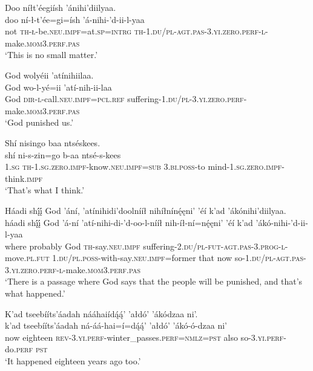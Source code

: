 \newpage
\ea\label{ex:text9-15-2}
Doo níłt’éegiísh ’ánihi’diilyaa.\\
\gll doo	ní-ł-t’ée=gi=ísh	’á-nihi-’d-ii-l-yaa\\
     not	\textsc{th}-\textsc{ł}-be.\textsc{neu}.\textsc{impf}=at.\textsc{sp}=\textsc{intrg}	\textsc{th}-1.\textsc{du}/\textsc{pl}-\textsc{agt}.\textsc{pas}-3.\textsc{yi}.\textsc{zero}.\textsc{perf}-\textsc{l}-make.\textsc{mom}3.\textsc{perf}.\textsc{pas}\\
\glt `This is no small matter.'
\z

\ea\label{ex:text9-15-3}
God wolyéii ’atínihiilaa.\\
\gll God	wo-l-yé=ii	’atí-nih-ii-laa\\
     God	\textsc{dir}-\textsc{l}-call.\textsc{neu}.\textsc{impf}=\textsc{pcl}.\textsc{ref}	suffering-1.\textsc{du}/\textsc{pl}-3.\textsc{yi}.\textsc{zero}.\textsc{perf}-make.\textsc{mom}3.\textsc{perf}.\textsc{pas}\\
\glt `God punished us.'
\z

\ea\label{ex:text9-15-4}
Shí nisingo baa ntséskees.\\
\gll shí	ni-s-zin=go	b-aa	ntsé-s-kees\\
     1.\textsc{sg}	\textsc{th}-1.\textsc{sg}.\textsc{zero}.\textsc{impf}-know.\textsc{neu}.\textsc{impf}=\textsc{sub}	3.\textsc{bi}.\textsc{poss}-to	mind-1.\textsc{sg}.\textsc{zero}.\textsc{impf}-think.\textsc{impf}\\
\glt `That’s what I think.'
\z

\ea\label{ex:text9-15-5}
Háadi shį́į́ God ’ání, ’atínihidi’doolnííł nihíłnínę́ęni’ ’éí k’ad ’ákónihi’diilyaa.\\
\gll háadi	shį́į́	God	’á-ní	’atí-nihi-di-’d-oo-l-nííł	nih-íł-ní=nę́ęni’	’éí	k’ad	’ákó-nihi-’d-ii-l-yaa\\
     where	probably	God	\textsc{th}-say.\textsc{neu}.\textsc{impf}	suffering-2.\textsc{du}/\textsc{pl}-\textsc{fut}-\textsc{agt}.\textsc{pas}-3.\textsc{prog}-\textsc{l}-move.\textsc{pl}.\textsc{fut}	1.\textsc{du}/\textsc{pl}.\textsc{poss}-with-say.\textsc{neu}.\textsc{impf}=former	that	now	so-1.\textsc{du}/\textsc{pl}-\textsc{agt}.\textsc{pas}-3.\textsc{yi}.\textsc{zero}.\textsc{perf}-\textsc{l}-make.\textsc{mom}3.\textsc{perf}.\textsc{pas}\\
\glt `There is a passage where God says that the people will be punished, and that's what happened.'
\z

\ea\label{ex:text9-15-6}
K’ad tseebííts’áadah nááhaiídą́ą́’ ’ałdó’ ’ákódzaa ni’.\\
\gll k’ad	tseebííts’áadah	ná-áá-hai=í=dą́ą́’	’ałdó’	’ákó-ó-dzaa	ni’\\
     now	eighteen	\textsc{rev}-3.\textsc{yi}.\textsc{perf}-winter\_passes.\textsc{perf}=\textsc{nmlz}=\textsc{pst}	also	so-3.\textsc{yi}.\textsc{perf}-do.\textsc{perf}	\textsc{pst}\\
\glt `It happened eighteen years ago too.'
\z

